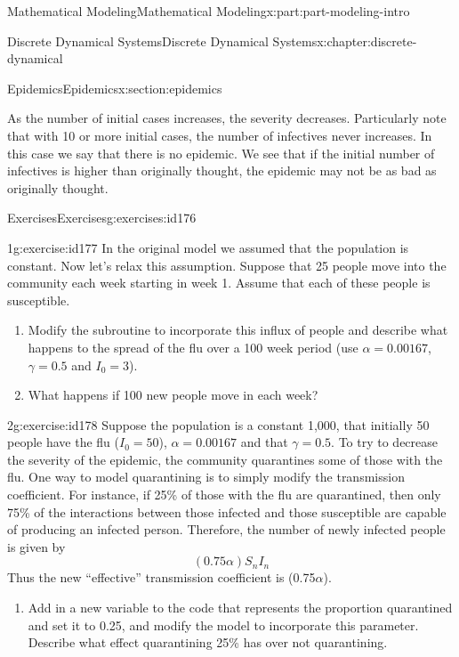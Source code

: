 \documentclass[oneside,10pt,]{book}
\numberwithin{equation}{section}
\begin{document}
\begin{partptx}{Mathematical Modeling}{}{Mathematical Modeling}{}{}{x:part:part-modeling-intro}
\begin{chapterptx}{Discrete Dynamical Systems}{}{Discrete Dynamical Systems}{}{}{x:chapter:discrete-dynamical}
\begin{sectionptx}{Epidemics}{}{Epidemics}{}{}{x:section:epidemics}
\par
As the number of initial cases increases, the severity decreases. Particularly note that with 10 or more initial cases, the number of infectives never increases. In this case we say that there is no epidemic. We see that if the initial number of infectives is higher than originally thought, the epidemic may not be as bad as originally thought.%
%
%
\typeout{************************************************}
\typeout{************************************************}
%
\begin{exercises-subsection-numberless}{Exercises}{}{Exercises}{}{}{g:exercises:id176}
\begin{divisionexercise}{1}{}{}{g:exercise:id177}%
In the original model we assumed that the population is constant. Now let’s relax this assumption. Suppose that 25 people move into the community each week starting in week 1. Assume that each of these people is susceptible.%
\begin{enumerate}[font=\bfseries,label=(\alph*),ref=\alph*]
\item{}Modify the subroutine to incorporate this influx of people and describe what happens to the spread of the flu over a 100 week period (use \(\alpha = 0.00167\), \(\gamma = 0.5\) and \(I_0 = 3\)).%
\item{}What happens if 100 new people move in each week?%
\end{enumerate}
\end{divisionexercise}%
\begin{divisionexercise}{2}{}{}{g:exercise:id178}%
Suppose the population is a constant 1,000, that initially 50 people have the flu (\(I_0 = 50\)), \(\alpha = 0.00167\) and that \(\gamma = 0.5\). To try to decrease the severity of the epidemic, the community quarantines some of those with the flu. One way to model quarantining is to simply modify the transmission coefficient. For instance, if 25\% of those with the flu are quarantined, then only 75\% of the interactions between those infected and those susceptible are capable of producing an infected person. Therefore, the number of newly infected people is given by%
%
\begin{equation*}
(0.75\alpha)S_n I_n
\end{equation*}
Thus the new ``effective'' transmission coefficient is (0.75\(\alpha\)).%
\begin{enumerate}[font=\bfseries,label=(\alph*),ref=\alph*]
\item{}Add in a new variable to the code that represents the proportion quarantined and set it to 0.25, and modify the model to incorporate this parameter. Describe what effect quarantining 25\% has over not quarantining.%

\end{enumerate}
\end{divisionexercise}
\end{exercises-subsection-numberless}
\end{sectionptx}
\end{chapterptx}
\end{partptx}
\end{document}
